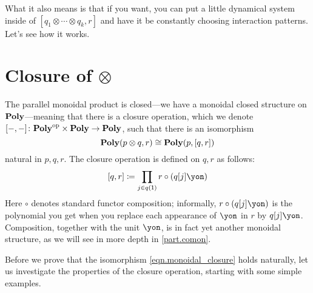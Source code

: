 \documentclass[Book-Poly]{subfiles}
\begin{document}
What it also means is that if you want, you can put a little dynamical system inside of $[q_1\otimes\cdots\otimes q_k,r]$ and have it be constantly choosing interaction patterns. Let's see how it works.


\section{Closure of $\otimes$}%

The parallel monoidal product is closed---we have a monoidal closed structure on $\mathbf{Poly}$---meaning that there is a closure operation, which we denote $[-,-]\colon\mathbf{Poly}^{\textnormal{op}}\times\mathbf{Poly}\to\mathbf{Poly}$, such that there is an isomorphism
\begin{equation}\label{eqn.monoidal_closure}
  \mathbf{Poly}(p\otimes q,r) \cong \mathbf{Poly}(p,[q,r])
\end{equation}
natural in $p,q,r$.
The closure operation is defined on $q,r$ as follows:
\begin{equation}\label{eqn.par_hom}
	\ihom{q,r} \coloneqq \prod_{j\in q(\1)}r\circ(q[j]\yon)
\end{equation}
Here $\circ$ denotes standard functor composition; informally, $r \circ (q[j]\yon)$ is the polynomial you get when you replace each appearance of $\yon$ in $r$ by $q[j]\yon$.
Composition, together with the unit $\yon$, is in fact yet another monoidal structure, as we will see in more depth in \cref{part.comon}.

Before we prove that the isomorphism \eqref{eqn.monoidal_closure} holds naturally, let us investigate the properties of the closure operation, starting with some simple examples.
\end{document}
